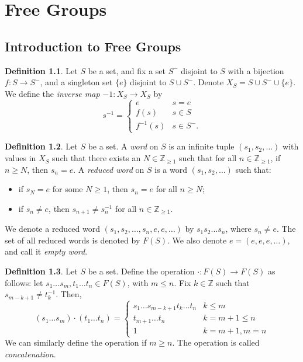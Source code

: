 \documentclass[a4paper, openany]{memoir}
\theoremstyle{definition}
\newtheorem{definition}{Definition}[section]
\theoremstyle{plain}
\begin{document}
    \chapter{Free Groups}
    \section{Introduction to Free Groups}
    \begin{definition}
        Let $S$ be a set, and fix a set $S^-$ disjoint to $S$ with a bijection $f\colon S \to S^-$, and a singleton set $\{e\}$ disjoint to $S \cup S^-$. Denote $X_S = S \cup S^- \cup \{e\}$. We define the \emph{inverse map} $-1\colon X_S \to X_S$ by
        \[s^{-1} = \begin{cases}
            e & s = e \\
            f(s) & s \in S \\
            f^{-1}(s) & s \in S^-.
        \end{cases}\]
    \end{definition}

    \begin{definition}
        Let $S$ be a set. A \emph{word} on $S$ is an infinite tuple $(s_1, s_2, \dots)$ with values in $X_S$ such that there exists an $N \in \mathbb{Z}_{\geq 1}$ such that for all $n \in \mathbb{Z}_{\geq 1}$, if $n \geq N$, then $s_n = e$. A \emph{reduced word} on $S$ is a word $(s_1, s_2, \dots)$ such that:
        \begin{itemize}
            \item if $s_N = e$ for some $N \geq 1$, then $s_n = e$ for all $n \geq N$;
            \item if $s_n \neq e$, then $s_{n+1} \neq s_n^{-1}$ for all $n \in \mathbb{Z}_{\geq 1}$.
        \end{itemize}
        We denote a reduced word $(s_1, s_2, \dots, s_n, e, e, \dots)$ by $s_1s_2 \dots s_n$, where $s_n \neq e$. The set of all reduced words is denoted by $F(S)$. We also denote $e = (e, e, e, \dots)$, and call it \emph{empty word}.
    \end{definition}

    \begin{definition}
        Let $S$ be a set. Define the operation $\cdot \colon F(S) \to F(S)$ as follows: let $s_1 \dots s_m, t_1 \dots t_n \in F(S)$, with $m \leq n$. Fix $k \in \mathbb{Z}$ such that $s_{m-k+1} \neq t_k^{-1}$. Then,
        \[(s_1 \dots s_m) \cdot (t_1 \dots t_n) = \begin{cases}
            s_1 \dots s_{m-k+1} t_k \dots t_n & k \leq m \\
            t_{m+1} \dots t_n & k = m+1 \leq n \\
            1 & k = m+1, m = n
        \end{cases}\]
        We can similarly define the operation if $m \geq n$. The operation is called \emph{concatenation}.
    \end{definition}
\end{document}
